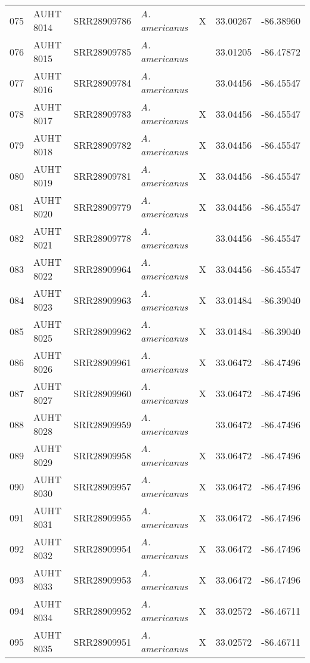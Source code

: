\begin{longtable}{ lllllll }
075 & AUHT 8014 & SRR28909786 & \textit{A. americanus} & X & 33.00267 & -86.38960 \\ 
076 & AUHT 8015 & SRR28909785 & \textit{A. americanus} &  & 33.01205 & -86.47872 \\ 
077 & AUHT 8016 & SRR28909784 & \textit{A. americanus} &  & 33.04456 & -86.45547 \\ 
078 & AUHT 8017 & SRR28909783 & \textit{A. americanus} & X & 33.04456 & -86.45547 \\ 
079 & AUHT 8018 & SRR28909782 & \textit{A. americanus} & X & 33.04456 & -86.45547 \\ 
080 & AUHT 8019 & SRR28909781 & \textit{A. americanus} & X & 33.04456 & -86.45547 \\ 
081 & AUHT 8020 & SRR28909779 & \textit{A. americanus} & X & 33.04456 & -86.45547 \\ 
082 & AUHT 8021 & SRR28909778 & \textit{A. americanus} &  & 33.04456 & -86.45547 \\ 
083 & AUHT 8022 & SRR28909964 & \textit{A. americanus} & X & 33.04456 & -86.45547 \\ 
084 & AUHT 8023 & SRR28909963 & \textit{A. americanus} & X & 33.01484 & -86.39040 \\ 
085 & AUHT 8025 & SRR28909962 & \textit{A. americanus} & X & 33.01484 & -86.39040 \\ 
086 & AUHT 8026 & SRR28909961 & \textit{A. americanus} & X & 33.06472 & -86.47496 \\ 
087 & AUHT 8027 & SRR28909960 & \textit{A. americanus} & X & 33.06472 & -86.47496 \\ 
088 & AUHT 8028 & SRR28909959 & \textit{A. americanus} &  & 33.06472 & -86.47496 \\ 
089 & AUHT 8029 & SRR28909958 & \textit{A. americanus} & X & 33.06472 & -86.47496 \\ 
090 & AUHT 8030 & SRR28909957 & \textit{A. americanus} & X & 33.06472 & -86.47496 \\ 
091 & AUHT 8031 & SRR28909955 & \textit{A. americanus} & X & 33.06472 & -86.47496 \\ 
092 & AUHT 8032 & SRR28909954 & \textit{A. americanus} & X & 33.06472 & -86.47496 \\ 
093 & AUHT 8033 & SRR28909953 & \textit{A. americanus} & X & 33.06472 & -86.47496 \\ 
094 & AUHT 8034 & SRR28909952 & \textit{A. americanus} & X & 33.02572 & -86.46711 \\ 
095 & AUHT 8035 & SRR28909951 & \textit{A. americanus} & X & 33.02572 & -86.46711 \\ 

\end{longtable}
